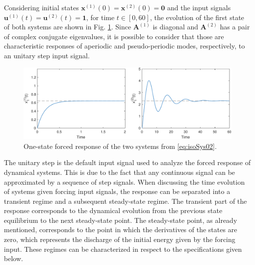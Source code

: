 \documentclass[a4paper,11pt]{book}
\numberwithin{figure}{chapter}
\numberwithin{equation}{chapter}
\numberwithin{table}{chapter}
\theoremstyle{definition}
\begin{document}
Considering initial states $\bm{x}^{(1)}(0) = \bm{x}^{(2)}(0) = \bm{0}$ and the input signals $\bm{u}^{(1)}(t) = \bm{u}^{(2)}(t) = \bm{1}$, for time $t \in [0, 60]$, the evolution of the first state of both systems are shown in Fig. \ref{fig:forcedResponse}. Since $\bm{A}^{(1)}$ is diagonal and $\bm{A}^{(2)}$ has a pair of complex conjugate eigenvalues, it is possible to consider that those are characteristic responses of aperiodic and pseudo-periodic modes, respectively, to an unitary step input signal.

\begin{figure}[ht] \centering
    \includegraphics[width=\textwidth]{chapter2/forcedResponse}
    
    \caption{One-state forced response of the two systems from \eqref{eq:isoSys02}.}
    \label{fig:forcedResponse}
\end{figure}

The unitary step is the default input signal used to analyze the forced response of dynamical systems. This is due to the fact that any continuous signal can be approximated by a sequence of step signals. When discussing the time evolution of systems given forcing input signals, the response can be separated into a transient regime and a subsequent steady-state regime. The transient part of the response corresponds to the dynamical evolution from the previous state equilibrium to the next steady-state point. The steady-state point, as already mentioned, corresponds to the point in which the derivatives of the states are zero, which represents the discharge of the initial energy given by the forcing input. These regimes can be characterized in respect to the specifications given below.
\end{document}
